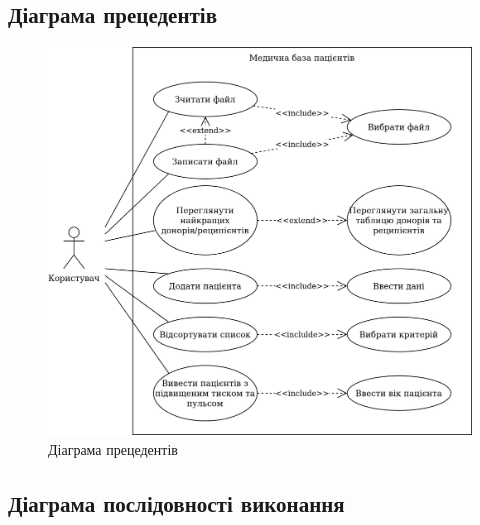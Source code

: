 \documentclass[oneside,14pt]{extarticle}
\begin{document}
\subsection{Діаграма прецедентів}
\begin{figure}[H]
	\centering
	\includegraphics[scale=0.4]{2}
	\caption{Діаграма прецедентів}
\end{figure}

\subsection{Діаграма послідовності виконання}
\end{document}
